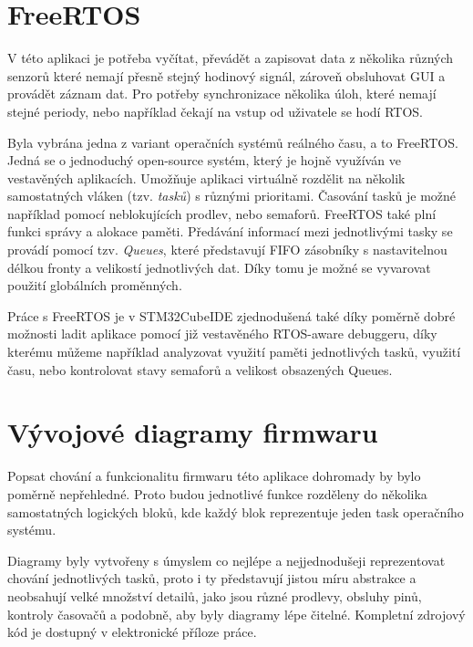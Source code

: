 \section{FreeRTOS}
V této aplikaci je potřeba vyčítat, převádět a zapisovat data z několika různých senzorů které nemají přesně stejný hodinový signál, zároveň obsluhovat \ac{GUI} a provádět záznam dat. Pro potřeby synchronizace několika úloh, které nemají stejné periody, nebo například čekají na vstup od uživatele se hodí \ac{RTOS}.

Byla vybrána jedna z variant operačních systémů reálného času, a to FreeRTOS. Jedná se o jednoduchý open-source systém, který je hojně využíván ve vestavěných aplikacích. Umožňuje aplikaci virtuálně rozdělit na několik samostatných vláken (tzv. \emph{tasků}) s různými prioritami. Časování tasků je možné například pomocí neblokujících prodlev, nebo semaforů. FreeRTOS také plní funkci správy a alokace paměti. Předávání informací mezi jednotlivými tasky se provádí pomocí tzv. \emph{Queues}, které představují \ac{FIFO} zásobníky s nastavitelnou délkou fronty a velikostí jednotlivých dat. Díky tomu je možné se vyvarovat použití globálních proměnných. \cite{Zhu2011}

Práce s FreeRTOS je v STM32CubeIDE zjednodušená také díky poměrně dobré možnosti ladit aplikace pomocí již vestavěného RTOS-aware debuggeru, díky kterému můžeme například analyzovat využití paměti jednotlivých tasků, využití času, nebo kontrolovat stavy semaforů a velikost obsazených Queues. 

\section{Vývojové diagramy firmwaru}
Popsat chování a funkcionalitu firmwaru této aplikace dohromady by bylo poměrně nepřehledné. Proto budou jednotlivé funkce rozděleny do několika samostatných logických bloků, kde každý blok reprezentuje jeden task operačního systému.

Diagramy byly vytvořeny s úmyslem co nejlépe a nejjednodušeji reprezentovat chování jednotlivých tasků, proto i ty představují jistou míru abstrakce a neobsahují velké množství detailů, jako jsou různé prodlevy, obsluhy pinů, kontroly časovačů a podobně, aby byly diagramy lépe čitelné. Kompletní zdrojový kód je dostupný v elektronické příloze práce.

